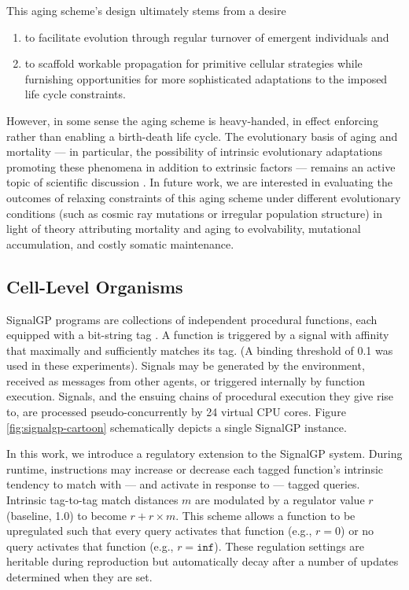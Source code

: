 This aging scheme's design ultimately stems from a desire
\begin{enumerate}
\item to facilitate evolution through regular turnover of emergent individuals and
\item to scaffold workable propagation for primitive cellular strategies while furnishing opportunities for more sophisticated adaptations to the imposed life cycle constraints.
\end{enumerate}
However, in some sense the aging scheme is heavy-handed, in effect enforcing rather than enabling a birth-death life cycle.
The evolutionary basis of aging and mortality --- in particular, the possibility of intrinsic evolutionary adaptations promoting these phenomena in addition to extrinsic factors  --- remains an active topic of scientific discussion \cite{baig2014evolution}.
In future work, we are interested in evaluating the outcomes of relaxing constraints of this aging scheme under different evolutionary conditions (such as cosmic ray mutations or irregular population structure) in light of theory attributing mortality and aging to evolvability, mutational accumulation, and costly somatic maintenance.

\subsection{Cell-Level Organisms} \label{sup:cell_level_organisms}



SignalGP programs are collections of independent procedural functions, each equipped with a bit-string tag \cite{lalejini2018evolving}.
A function is triggered by a signal with affinity that maximally and sufficiently matches its tag.
(A binding threshold of 0.1 was used in these experiments).
Signals may be generated by the environment, received as messages from other agents, or triggered internally by function execution.
Signals, and the ensuing chains of procedural execution they give rise to, are processed pseudo-concurrently by 24 virtual CPU cores.
Figure \ref{fig:signalgp-cartoon} schematically depicts a single SignalGP instance.

In this work, we introduce a regulatory extension to the SignalGP system.
During runtime, instructions may increase or decrease each tagged function's intrinsic tendency to match with --- and activate in response to --- tagged queries.
Intrinsic tag-to-tag match distances $m$ are modulated by a regulator value $r$ (baseline, 1.0) to become $r + r \times m$.
This scheme allows a function to be upregulated such that every query activates that function (e.g., $r = 0$) or no query activates that function (e.g., $r = \texttt{inf}$).
These regulation settings are heritable during reproduction but automatically decay after a number of updates determined when they are set.

